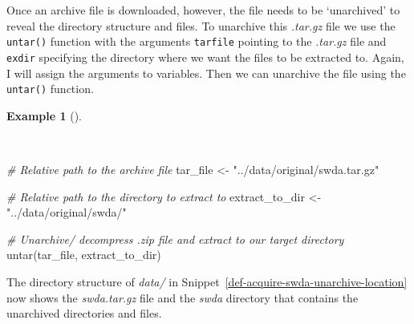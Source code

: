 \documentclass[
  letterpaper,
  krantz1]{latex/krantz-mod}
\newenvironment{Shaded}{\begin{snugshade}}{\end{snugshade}}
\newcommand{\CommentTok}[1]{\textcolor[rgb]{0.00,0.00,0.00}{\textit{#1}}}
\newcommand{\FunctionTok}[1]{\textcolor[rgb]{0.00,0.00,0.00}{#1}}
\newcommand{\NormalTok}[1]{\textcolor[rgb]{0.00,0.00,0.00}{#1}}
\newcommand{\OtherTok}[1]{\textcolor[rgb]{0.00,0.00,0.00}{#1}}
\newcommand{\StringTok}[1]{\textcolor[rgb]{0.00,0.00,0.00}{#1}}
\theoremstyle{definition}
\newtheorem{example}{Example}[chapter]
\theoremstyle{definition}
\theoremstyle{remark}
\begin{document}
Once an archive file is downloaded, however, the file needs to be
`unarchived' to reveal the directory structure and files. To unarchive
this \emph{.tar.gz} file we use the \texttt{untar()} function with the
arguments \texttt{tarfile} pointing to the \emph{.tar.gz} file and
\texttt{exdir} specifying the directory where we want the files to be
extracted to. Again, I will assign the arguments to variables. Then we
can unarchive the file using the \texttt{untar()} function.

\begin{example}[]\protect\hypertarget{exm-acquire-swda-archive-file}{}\label{exm-acquire-swda-archive-file}

~

\begin{Shaded}
\begin{Highlighting}[numbers=left,,]
\CommentTok{\# Relative path to the archive file}
\NormalTok{tar\_file }\OtherTok{\textless{}{-}} \StringTok{"../data/original/swda.tar.gz"}

\CommentTok{\# Relative path to the directory to extract to}
\NormalTok{extract\_to\_dir }\OtherTok{\textless{}{-}} \StringTok{"../data/original/swda/"}

\CommentTok{\# Unarchive/ decompress .zip file and extract to our target directory}
\FunctionTok{untar}\NormalTok{(tar\_file, extract\_to\_dir)}
\end{Highlighting}
\end{Shaded}

\end{example}

The directory structure of \emph{data/} in
Snippet~\ref{def-acquire-swda-unarchive-location} now shows the
\emph{swda.tar.gz} file and the \emph{swda} directory that contains the
unarchived directories and files.

\pagebreak
\end{document}
